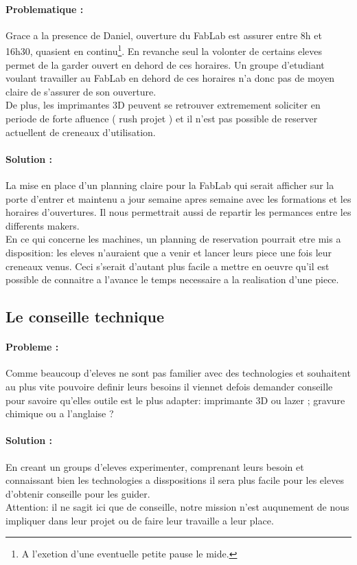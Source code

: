 \documentclass[12pt,a4paper]{article}
\begin{document}
\paragraph{Problematique :}
Grace a la presence de Daniel, ouverture du FabLab est assurer entre 8h et 16h30, quasient en continu\footnote{A l'exetion d'une eventuelle petite pause le mide.}. En revanche seul la volonter de certains eleves permet de la garder ouvert en dehord de ces horaires. Un groupe d'etudiant voulant travailler au FabLab en dehord de ces horaires n'a donc pas de moyen claire de s'assurer de son ouverture. \\
De plus, les imprimantes 3D peuvent se retrouver extremement soliciter en periode de forte afluence ( rush projet ) et il n'est pas possible de reserver actuellent de creneaux d'utilisation. 
\paragraph{Solution :}
La mise en place d'un planning claire pour la FabLab qui serait afficher sur la porte d'entrer et maintenu a jour semaine apres semaine avec les formations et les horaires d'ouvertures. Il nous permettrait aussi de repartir les permances entre les differents makers.\\
En ce qui concerne les machines, un planning de reservation pourrait etre mis a disposition: les eleves n'auraient que a venir et lancer leurs piece une fois leur creneaux venus. Ceci s'serait d'autant plus facile a mettre en oeuvre qu'il est possible de connaitre a l'avance le temps necessaire a la realisation d'une piece.
\subsection{Le conseille technique}
\paragraph{Probleme : }
Comme beaucoup d'eleves ne sont pas familier avec des technologies et souhaitent au plus vite pouvoire definir leurs besoins il viennet defois demander conseille pour savoire qu'elles outile est le plus adapter: imprimante 3D ou lazer ; gravure chimique ou a l'anglaise ?
\paragraph{Solution :} 
En creant un groups d'eleves experimenter, comprenant leurs besoin et connaissant bien les technologies a disspositions il sera plus facile pour les eleves d'obtenir conseille pour les guider.\\
Attention: il ne sagit ici que de conseille, notre mission n'est auqunement de nous impliquer dans leur projet ou de faire leur travaille a leur place.
\end{document}
